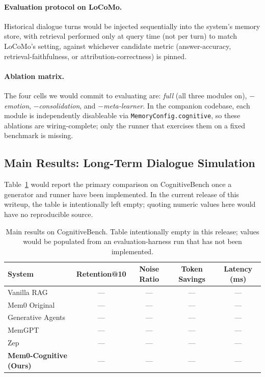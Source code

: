\paragraph{Evaluation protocol on LoCoMo.} Historical dialogue turns would be injected sequentially into the system's memory store, with retrieval performed only at query time (not per turn) to match LoCoMo's setting, against whichever candidate metric (answer-accuracy, retrieval-faithfulness, or attribution-correctness) is pinned.

\paragraph{Ablation matrix.} The four cells we would commit to evaluating are: \emph{full} (all three modules on), \emph{$-$emotion}, \emph{$-$consolidation}, and \emph{$-$meta-learner}. In the companion codebase, each module is independently disableable via \texttt{MemoryConfig.cognitive}, so these ablations are wiring-complete; only the runner that exercises them on a fixed benchmark is missing.

\subsection{Main Results: Long-Term Dialogue Simulation}
\label{subsec:main_results}

Table~\ref{tab:main_results} would report the primary comparison on
CognitiveBench once a generator and runner have been implemented.
In the current release of this writeup, the table is intentionally left
empty; quoting numeric values here would have no reproducible source.

\begin{table}[t]
\centering
\small
\begin{tabular}{lcccc}
\toprule
\textbf{System} & \textbf{Retention@10} & \textbf{Noise Ratio} & \textbf{Token Savings} & \textbf{Latency (ms)} \\
\midrule
Vanilla RAG & --- & --- & --- & --- \\
Mem0 Original & --- & --- & --- & --- \\
Generative Agents & --- & --- & --- & --- \\
MemGPT & --- & --- & --- & --- \\
Zep & --- & --- & --- & --- \\
\midrule
\textbf{Mem0-Cognitive (Ours)} & --- & --- & --- & --- \\
\bottomrule
\end{tabular}
\caption{Main results on CognitiveBench. Table intentionally empty in this release; values would be populated from an evaluation-harness run that has not been implemented.}
\label{tab:main_results}
\end{table}

